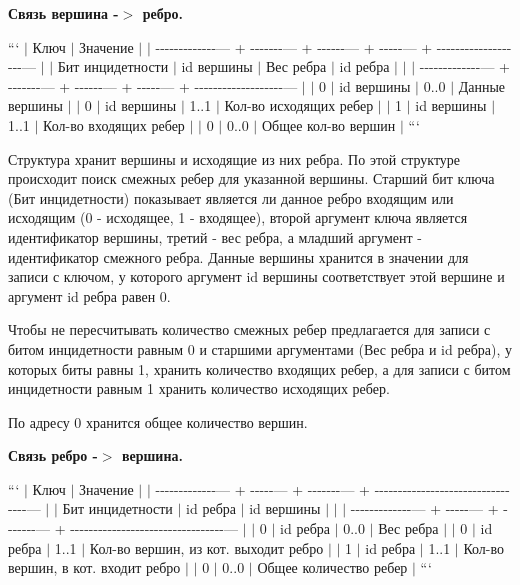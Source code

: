 \begin{DoxyEnumerate}
\item {\bfseries Связь вершина -\/$>$ ребро.}

``` $\vert$ Ключ $\vert$ Значение $\vert$ $\vert$ -\/-\/-\/-\/-\/-\/-\/-\/-\/-\/-\/-\/-\/--- + -\/-\/-\/-\/-\/-\/-\/--- + -\/-\/-\/-\/-\/-\/--- + -\/-\/-\/-\/-\/--- + -\/-\/-\/-\/-\/-\/-\/-\/-\/-\/-\/-\/-\/-\/-\/-\/-\/-\/-\/--- $\vert$ $\vert$ Бит инцидетности $\vert$ id вершины $\vert$ Вес ребра $\vert$ id ребра $\vert$ $\vert$ $\vert$ -\/-\/-\/-\/-\/-\/-\/-\/-\/-\/-\/-\/-\/--- + -\/-\/-\/-\/-\/-\/-\/--- + -\/-\/-\/-\/-\/-\/--- + -\/-\/-\/-\/-\/--- + -\/-\/-\/-\/-\/-\/-\/-\/-\/-\/-\/-\/-\/-\/-\/-\/-\/-\/-\/--- $\vert$ $\vert$ 0 $\vert$ id вершины $\vert$ 0..0 $\vert$ Данные вершины $\vert$ $\vert$ 0 $\vert$ id вершины $\vert$ 1..1 $\vert$ Кол-\/во исходящих ребер $\vert$ $\vert$ 1 $\vert$ id вершины $\vert$ 1..1 $\vert$ Кол-\/во входящих ребер $\vert$ $\vert$ 0 $\vert$ 0..0 $\vert$ Общее кол-\/во вершин $\vert$ ```

Структура хранит вершины и исходящие из них ребра. По этой структуре происходит поиск смежных ребер для указанной вершины. Старший бит ключа ({\ttfamily Бит инцидетности}) показывает является ли данное ребро входящим или исходящим (0 -\/ исходящее, 1 -\/ входящее), второй аргумент ключа является идентификатор вершины, третий -\/ вес ребра, а младший аргумент -\/ идентификатор смежного ребра. Данные вершины хранится в значении для записи с ключом, у которого аргумент {\ttfamily id вершины} соответствует этой вершине и аргумент {\ttfamily id ребра} равен 0.

Чтобы не пересчитывать количество смежных ребер предлагается для записи с битом инцидетности равным 0 и старшими аргументами ({\ttfamily Вес ребра} и {\ttfamily id ребра}), у которых биты равны 1, хранить количество входящих ребер, а для записи с битом инцидетности равным 1 хранить количество исходящих ребер.

По адресу 0 хранится общее количество вершин.
\item {\bfseries Связь ребро -\/$>$ вершина.}

``` $\vert$ Ключ $\vert$ Значение $\vert$ $\vert$ -\/-\/-\/-\/-\/-\/-\/-\/-\/-\/-\/-\/-\/--- + -\/-\/-\/-\/-\/--- + -\/-\/-\/-\/-\/-\/-\/--- + -\/-\/-\/-\/-\/-\/-\/-\/-\/-\/-\/-\/-\/-\/-\/-\/-\/-\/-\/-\/-\/-\/-\/-\/-\/-\/-\/-\/-\/-\/-\/-\/-\/--- $\vert$ $\vert$ Бит инцидетности $\vert$ id ребра $\vert$ id вершины $\vert$ $\vert$ $\vert$ -\/-\/-\/-\/-\/-\/-\/-\/-\/-\/-\/-\/-\/--- + -\/-\/-\/-\/-\/--- + -\/-\/-\/-\/-\/-\/-\/--- + -\/-\/-\/-\/-\/-\/-\/-\/-\/-\/-\/-\/-\/-\/-\/-\/-\/-\/-\/-\/-\/-\/-\/-\/-\/-\/-\/-\/-\/-\/-\/-\/-\/--- $\vert$ $\vert$ 0 $\vert$ id ребра $\vert$ 0..0 $\vert$ Вес ребра $\vert$ $\vert$ 0 $\vert$ id ребра $\vert$ 1..1 $\vert$ Кол-\/во вершин, из кот. выходит ребро $\vert$ $\vert$ 1 $\vert$ id ребра $\vert$ 1..1 $\vert$ Кол-\/во вершин, в кот. входит ребро $\vert$ $\vert$ 0 $\vert$ 0..0 $\vert$ Общее количество ребер $\vert$ ```


\end{DoxyEnumerate}
